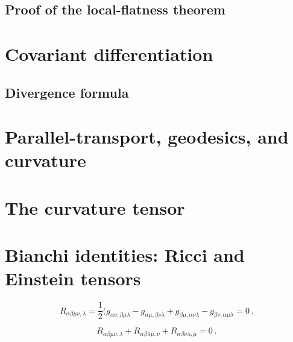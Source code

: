 \documentclass[12pt,a4paper]{article}
\newcounter{theo}[section]\setcounter{theo}{0}
\begin{document}
\subsection{Proof of the local-flatness theorem}







\section{Covariant differentiation}







\subsection{Divergence formula}





\section{Parallel-transport, geodesics, and curvature}





\section{The curvature tensor}







\section{Bianchi identities: Ricci and Einstein tensors}

\begin{equation}
R_{\alpha\beta\mu\nu, \lambda} = \frac{1}{2} (g_{\alpha\nu, \beta\mu\lambda} -g_{\alpha\mu, \beta\nu\lambda} +g_{\beta\mu, \alpha\nu\lambda} -g_{\beta\nu, \alpha\mu\lambda} = 0 ~.
\end{equation}

\begin{equation}
R_{\alpha\beta\mu\nu, \lambda} +R_{\alpha\beta\lambda\mu, \nu} +R_{\alpha\beta\nu\lambda, \mu} = 0 ~.
\end{equation}
\end{document}
